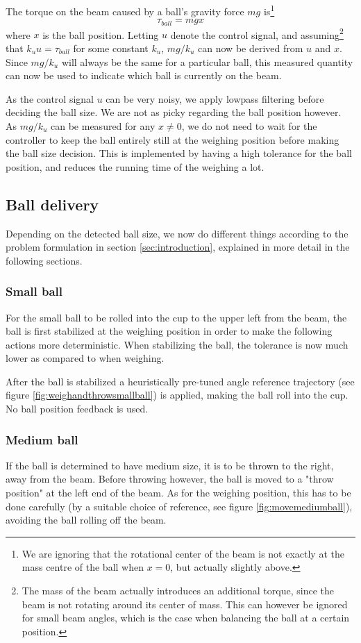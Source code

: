 The torque on the beam caused by a ball's gravity force $mg$ is\footnote{We are ignoring that the rotational center of the beam is not exactly at the mass centre of the ball when $x=0$, but actually slightly above.}
\[
\tau_{ball} = mgx
\]
where $x$ is the ball position. Letting $u$ denote the control signal, and assuming\footnote{The mass of the beam actually introduces an additional torque, since the beam is not rotating around its center of mass.
This can however be ignored for small beam angles, which is the case when balancing the ball at a certain position.} that $k_u u = \tau_{ball}$ for some constant $k_u$, $mg/k_u$ can now be derived from $u$ and $x$.
Since $mg/k_u$ will always be the same for a particular ball, this measured quantity can now be used to indicate which ball is currently on the beam.

As the control signal $u$ can be very noisy, we apply lowpass filtering before deciding the ball size.
We are not as picky regarding the ball position however.
As $mg/k_u$ can be measured for any $x\neq0$, we do not need to wait for the controller to keep the ball entirely still at the weighing position before making the ball size decision.
This is implemented by having a high tolerance for the ball position, and reduces the running time of the weighing a lot.

\subsection{Ball delivery}\label{sec:ball_delivery}
Depending on the detected ball size, we now do different things according to the problem formulation in section \ref{sec:introduction}, explained in more detail in the following sections.

\subsubsection{Small ball}\label{sec:small_ball_delivery}
For the small ball to be rolled into the cup to the upper left from the beam, the ball is first stabilized at the weighing position in order to make the following actions more deterministic.
When stabilizing the ball, the tolerance is now much lower as compared to when weighing.

After the ball is stabilized a heuristically pre-tuned angle reference trajectory (see figure \ref{fig:weighandthrowsmallball}) is applied, making the ball roll into the cup.
No ball position feedback is used.

\subsubsection{Medium ball}\label{sec:medium_ball_delivery}
If the ball is determined to have medium size, it is to be thrown to the right, away from the beam.
Before throwing however, the ball is moved to a "throw position" at the left end of the beam.
As for the weighing position, this has to be done carefully (by a suitable choice of reference, see figure \ref{fig:movemediumball}), avoiding the ball rolling off the beam.

